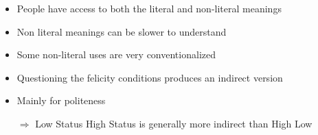 \documentclass[headrule,footrule]{foils}
\begin{document}
\begin{exe}
  \ex
  \begin{xlist}
    \ex {}
    \ex {}
  \end{xlist}
  \ex 
  \begin{xlist}
    \ex {}
    \ex {}
  \end{xlist}
  \ex
  \begin{xlist}
    \ex {}
    \ex {}
  \end{xlist}
\end{exe}
\begin{itemize}
\item People have access to both the literal and non-literal meanings
\item Non literal meanings can be slower to understand
\item Some non-literal uses are very conventionalized 
  \\  \into {}
\item Questioning the felicity conditions produces an indirect version
\end{itemize}



\begin{itemize}
\item Mainly for politeness

  \begin{exe}
    \begin{xlist}
      \ex {}
    \end{xlist}
    \begin{xlist}
      \ex {}
    \end{xlist}
    \begin{xlist}
      \ex {}
    \end{xlist}
  \end{exe}
\item[$\Rightarrow$] Low Status \into High Status is generally more indirect than High \into Low 
\end{itemize}
\end{document}
